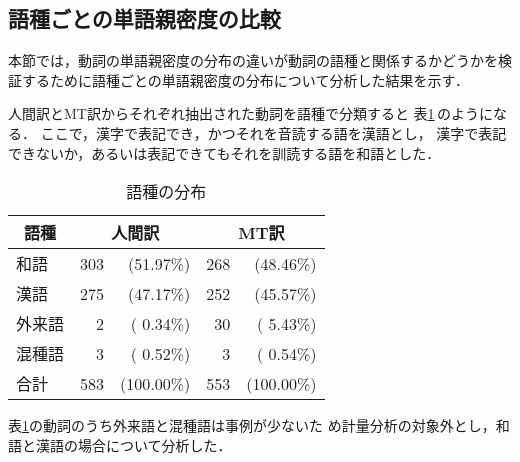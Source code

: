 \subsection{語種ごとの単語親密度の比較}
\label{sec:result:wordclass}

本節では，動詞の単語親密度の分布の違いが動詞の語種と関係するかどうかを検
証するために語種ごとの単語親密度の分布について分析した結果を示す．

人間訳とMT訳からそれぞれ抽出された動詞を語種で分類すると
表\ref{tab:wordclass-kotonari}\,のようになる．
ここで，漢字で表記でき，かつそれを音読する語を漢語とし，
漢字で表記できないか，あるいは表記できてもそれを訓読する語を和語とした．
\begin{table}[htbp]
\caption{語種の分布}
\label{tab:wordclass-kotonari}
\begin{center}
\begin{tabular}{|l||r@{}r|r@{}r|}\hline
\multicolumn{1}{|c||}{語種} & \multicolumn{2}{c|}{人間訳} & 
\multicolumn{2}{c|}{MT訳} \\\hline\hline
和語	& 303 &  (51.97\%) & 268 &  (48.46\%) \\
漢語	& 275 &  (47.17\%) & 252 &  (45.57\%) \\
外来語	&   2 &  ( 0.34\%) &  30 &  ( 5.43\%) \\
混種語	&   3 &  ( 0.52\%) &   3 &  ( 0.54\%) \\\hline
合計	& 583 & (100.00\%) & 553 & (100.00\%) \\\hline
\end{tabular}
\end{center}
\end{table}

表\ref{tab:wordclass-kotonari}の動詞のうち外来語と混種語は事例が少ないた
め計量分析の対象外とし，和語と漢語の場合について分析した． 

